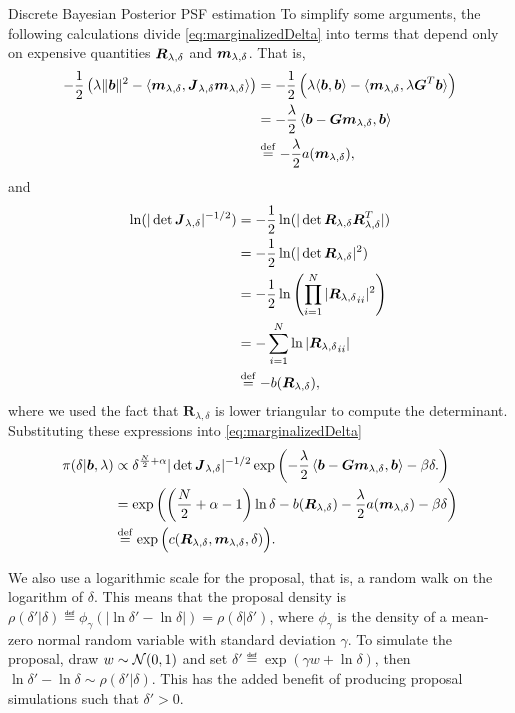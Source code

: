 \begin{chapter}{Discrete Bayesian Posterior PSF estimation}
To  simplify some arguments, the following calculations divide \eqref{eq:marginalizedDelta} into terms that depend only on expensive quantities $\mbox{\boldmath$R$}_{\lambda,\delta}$ and $\mbox{\boldmath$m$}_{\lambda,\delta}$. 
That is,
\begin{align}
    -\frac12 \left(\lambda \|\mbox{\boldmath$b$}\|^2- \langle \mbox{\boldmath$m$}_{\lambda,\delta},\mbox{\boldmath$J$}_{\lambda,\delta}\mbox{\boldmath$m$}_{\lambda,\delta}\rangle \right)
    &= -\frac12 \left(\lambda \langle\mbox{\boldmath$b$},\mbox{\boldmath$b$}\rangle- \langle \mbox{\boldmath$m$}_{\lambda,\delta},\lambda \mbox{\boldmath$G$}^T\mbox{\boldmath$b$}\rangle \right)\nonumber \\
    &= -\frac\lambda 2 \left\langle\mbox{\boldmath$b$} - \mbox{\boldmath$G$}\mbox{\boldmath$m$}_{\lambda,\delta},\mbox{\boldmath$b$}\right\rangle \nonumber\\
    &\stackrel{\rm def}{=} -\frac \lambda 2a(\mbox{\boldmath$m$}_{\lambda,\delta}), \label{eq:aConst}
\end{align}
and
\begin{align}
  \ln(|\det \mbox{\boldmath$J$}_{\lambda,\delta}|^{-1/2})
  &= -\frac 12\ln(|\det \mbox{\boldmath$R$}_{\lambda,\delta}\mbox{\boldmath$R$}_{\lambda,\delta}^T|)\nonumber\\
  &= -\frac 12\ln(|\det \mbox{\boldmath$R$}_{\lambda,\delta}|^2)\nonumber\\
  &= -\frac 12\ln\left(\prod_{i=1}^N |{\mbox{\boldmath$R$}_{\lambda,\delta}}_{ii}|^2\right) \nonumber\\
  &= -\sum_{i=1}^N\ln|{\mbox{\boldmath$R$}_{\lambda,\delta}}_{ii}|\nonumber\\
  &\stackrel{\rm def}{=} -b(\mbox{\boldmath$R$}_{\lambda,\delta}), 
\end{align}
where we used the fact that $\bm R_{\lambda,\delta}$ is lower triangular to compute the determinant.
Substituting these expressions into \eqref{eq:marginalizedDelta}
\begin{align}
  \pi(\delta|\mbox{\boldmath$b$},\lambda)
    &\propto \delta^{\frac N2+\alpha}|\det \mbox{\boldmath$J$}_{\lambda,\delta}|^{-1/2}\exp\left( -\frac\lambda 2 \left\langle\mbox{\boldmath$b$} - \mbox{\boldmath$G$}\mbox{\boldmath$m$}_{\lambda,\delta},\mbox{\boldmath$b$}\right\rangle -\beta\delta.  \right) \nonumber \\
    &= \exp\left( \left(\frac N2 +\alpha - 1\right)\ln\delta - b(\mbox{\boldmath$R$}_{\lambda,\delta}) -\frac \lambda 2 a(\mbox{\boldmath$m$}_{\lambda,\delta}) -\beta\delta  \right)\nonumber \\
    &\stackrel{\rm def}{=} \exp\Big( c(\mbox{\boldmath$R$}_{\lambda,\delta},\mbox{\boldmath$m$}_{\lambda,\delta},\delta)  \Big). \label{eq:deltaConstant}
\end{align}

We also use a logarithmic scale for the proposal, that is, a random walk on the logarithm of $\delta$.
This means that the proposal density is $\rho(\delta'|\delta) \eqdef \phi_\gamma(|\ln \delta' - \ln \delta|) =  \rho(\delta|\delta')$, where $\phi_\gamma$ is the density of a mean-zero normal random variable with standard deviation $\gamma$.
To simulate the proposal, draw $w\sim \mathcal{N}(0,1)$ and set $\delta'\eqdef \exp(\gamma w+\ln \delta)$, then $\ln\delta'-\ln\delta \sim \rho(\delta'|\delta)$. 
This has the added benefit of producing proposal simulations such that $\delta'>0$.


\end{chapter}
